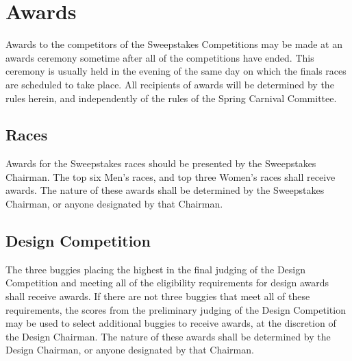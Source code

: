 \chapter{Awards}

	Awards to the competitors of the Sweepstakes Competitions may be made at an
	awards ceremony sometime after all of the competitions have ended. This 
	ceremony is usually held in the evening of the same day on which the finals
	races are scheduled to take place. All recipients of awards will be 
	determined by the rules herein, and independently of the rules of the Spring
	Carnival Committee.

\section{Races}

	Awards for the Sweepstakes races should be presented by the Sweepstakes
	Chairman. The top six Men's races, and top three Women's races shall receive 
	awards. The nature of these awards shall be determined by the Sweepstakes 
	Chairman, or anyone designated by that Chairman.

\section{Design Competition}

	The three buggies placing the highest in the final judging of the Design 
	Competition and meeting all of the eligibility requirements for design 
	awards shall receive awards. If there are not three buggies that meet all 
	of these requirements, the scores from the preliminary judging of the Design
	Competition may be used to select additional buggies to receive awards, at 
	the discretion of the Design Chairman. The nature of these awards shall be 
	determined by the Design Chairman, or anyone designated by that Chairman.

